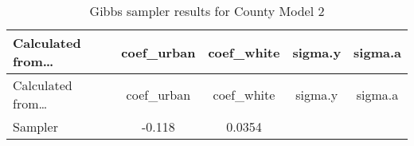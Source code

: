\documentclass[12pt,twoside]{reedthesis}
\begin{document}
  \begin{longtable}[]{@{}lcccc@{}}
  \caption{Gibbs sampler results for County Model 2
  \label{tab:gibbs_2}}\tabularnewline
  \toprule
  \begin{minipage}[b]{0.25\columnwidth}\raggedright\strut
  Calculated from\ldots{}\strut
  \end{minipage} & \begin{minipage}[b]{0.16\columnwidth}\centering\strut
  coef\_urban\strut
  \end{minipage} & \begin{minipage}[b]{0.16\columnwidth}\centering\strut
  coef\_white\strut
  \end{minipage} & \begin{minipage}[b]{0.12\columnwidth}\centering\strut
  sigma.y\strut
  \end{minipage} & \begin{minipage}[b]{0.12\columnwidth}\centering\strut
  sigma.a\strut
  \end{minipage}\tabularnewline
  \midrule
  \endfirsthead
  \toprule
  \begin{minipage}[b]{0.25\columnwidth}\raggedright\strut
  Calculated from\ldots{}\strut
  \end{minipage} & \begin{minipage}[b]{0.16\columnwidth}\centering\strut
  coef\_urban\strut
  \end{minipage} & \begin{minipage}[b]{0.16\columnwidth}\centering\strut
  coef\_white\strut
  \end{minipage} & \begin{minipage}[b]{0.12\columnwidth}\centering\strut
  sigma.y\strut
  \end{minipage} & \begin{minipage}[b]{0.12\columnwidth}\centering\strut
  sigma.a\strut
  \end{minipage}\tabularnewline
  \midrule
  \endhead
  \begin{minipage}[t]{0.25\columnwidth}\raggedright\strut
  Sampler\strut
  \end{minipage} & \begin{minipage}[t]{0.16\columnwidth}\centering\strut
  -0.118\strut
  \end{minipage} & \begin{minipage}[t]{0.16\columnwidth}\centering\strut
  0.0354\strut
  \end{minipage} & \begin{minipage}[t]{0.12\columnwidth}\centering\strut

\end{minipage}
\end{longtable}
\end{document}
